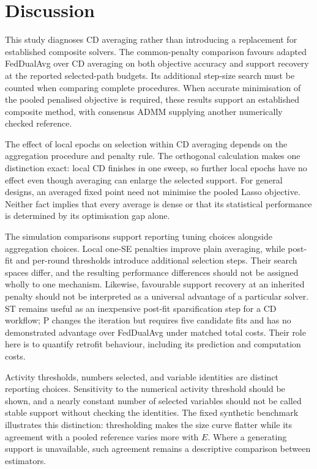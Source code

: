 \section{Discussion}
\label{sec:discussion}

This study diagnoses CD averaging rather than introducing a replacement
for established composite solvers. The common-penalty comparison favours
adapted FedDualAvg over CD averaging on both objective accuracy and support
recovery at the reported selected-path budgets. Its additional step-size
search must be counted when comparing complete procedures. When accurate
minimisation of the pooled penalised objective is required, these results
support an established composite method, with consensus ADMM supplying
another numerically checked reference.

The effect of local epochs on selection within CD averaging depends on the
aggregation procedure and penalty rule. The orthogonal calculation makes
one distinction exact: local CD finishes in one sweep, so further local
epochs have no effect even though averaging can enlarge the selected support.
For general designs, an averaged fixed point need not minimise the pooled
Lasso objective. Neither fact implies that every average is dense or that
its statistical performance is determined by its optimisation gap alone.

The simulation comparisons support reporting tuning choices alongside
aggregation choices. Local one-SE penalties improve plain averaging, while
post-fit and per-round thresholds introduce additional selection steps.
Their search spaces differ, and the resulting performance differences
should not be assigned wholly to one mechanism. Likewise, favourable
support recovery at an inherited penalty should not be interpreted as a
universal advantage of a particular solver. ST remains useful as an
inexpensive post-fit sparsification step for a CD workflow; P changes the
iteration but requires five candidate fits and has no demonstrated
advantage over FedDualAvg under matched total costs. Their role here is to
quantify retrofit behaviour, including its prediction and computation costs.

Activity thresholds, numbers selected, and variable identities are distinct
reporting choices. Sensitivity to the numerical activity threshold should
be shown, and a nearly constant number of selected variables should not be
called stable support without checking the identities. The fixed synthetic
benchmark illustrates this distinction: thresholding makes the size curve
flatter while its agreement with a pooled reference varies more with $E$.
Where a generating support is unavailable, such agreement remains a
descriptive comparison between estimators.

